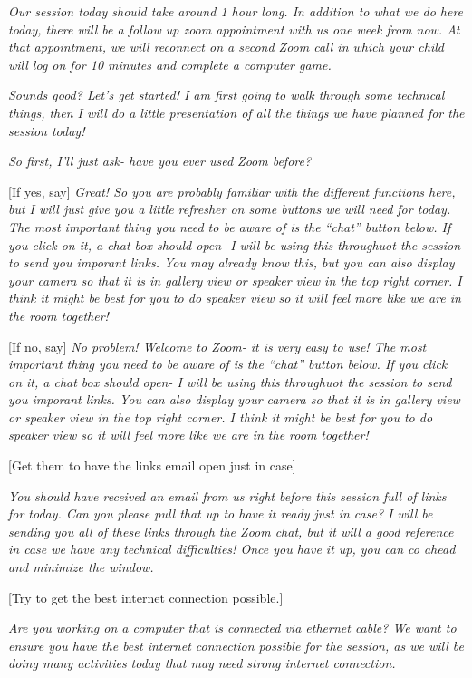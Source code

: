 \documentclass[]{book}
\begin{document}
\emph{Our session today should take around 1 hour long. In addition to what we do here today, there will be a follow up zoom appointment with us one week from now. At that appointment, we will reconnect on a second Zoom call in which your child will log on for 10 minutes and complete a computer game.}

\emph{Sounds good? Let's get started! I am first going to walk through some technical things, then I will do a little presentation of all the things we have planned for the session today!}

\emph{So first, I'll just ask- have you ever used Zoom before?}

{[}If yes, say{]} \emph{Great! So you are probably familiar with the different functions here, but I will just give you a little refresher on some buttons we will need for today. The most important thing you need to be aware of is the ``chat'' button below. If you click on it, a chat box should open- I will be using this throughuot the session to send you imporant links. You may already know this, but you can also display your camera so that it is in gallery view or speaker view in the top right corner. I think it might be best for you to do speaker view so it will feel more like we are in the room together!}

{[}If no, say{]} \emph{No problem! Welcome to Zoom- it is very easy to use! The most important thing you need to be aware of is the ``chat'' button below. If you click on it, a chat box should open- I will be using this throughuot the session to send you imporant links. You can also display your camera so that it is in gallery view or speaker view in the top right corner. I think it might be best for you to do speaker view so it will feel more like we are in the room together!}

{[}Get them to have the links email open just in case{]}

\emph{You should have received an email from us right before this session full of links for today. Can you please pull that up to have it ready just in case? I will be sending you all of these links through the Zoom chat, but it will a good reference in case we have any technical difficulties! Once you have it up, you can co ahead and minimize the window.}

{[}Try to get the best internet connection possible.{]}

\emph{Are you working on a computer that is connected via ethernet cable? We want to ensure you have the best internet connection possible for the session, as we will be doing many activities today that may need strong internet connection.}
\end{document}
